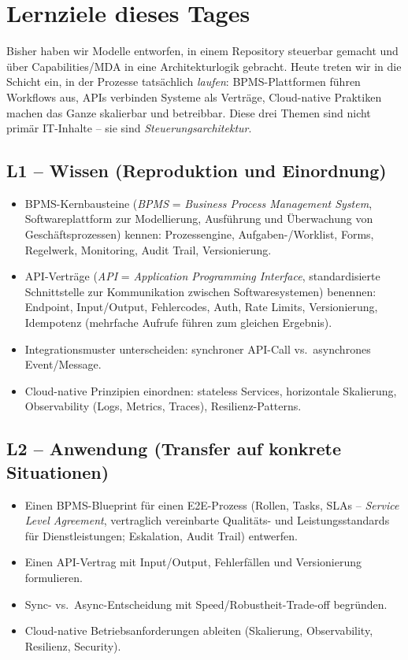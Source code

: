 \documentclass[11pt,a4paper,oneside]{article}
\begin{document}
\section*{Lernziele dieses Tages}
\thispagestyle{plain}

\noindent Bisher haben wir Modelle entworfen, in einem Repository steuerbar gemacht und über Capabilities/MDA in eine Architekturlogik gebracht. Heute treten wir in die Schicht ein, in der Prozesse tatsächlich \emph{laufen}: BPMS-Plattformen führen Workflows aus, APIs verbinden Systeme als Verträge, Cloud-native Praktiken machen das Ganze skalierbar und betreibbar. Diese drei Themen sind nicht primär IT-Inhalte -- sie sind \emph{Steuerungsarchitektur}.

\subsection*{L1 -- Wissen (Reproduktion und Einordnung)}
\begin{itemize}
  \item BPMS-Kernbausteine (\emph{BPMS} = \emph{Business Process Management System}, Softwareplattform zur Modellierung, Ausführung und Überwachung von Geschäftsprozessen) kennen: Prozessengine, Aufgaben-/Worklist, Forms, Regelwerk, Monitoring, Audit Trail, Versionierung.
  \item API-Verträge (\emph{API} = \emph{Application Programming Interface}, standardisierte Schnittstelle zur Kommunikation zwischen Softwaresystemen) benennen: Endpoint, Input/Output, Fehlercodes, Auth, Rate Limits, Versionierung, Idempotenz (mehrfache Aufrufe führen zum gleichen Ergebnis).
  \item Integrationsmuster unterscheiden: synchroner API-Call vs.\ asynchrones Event/Message.
  \item Cloud-native Prinzipien einordnen: stateless Services, horizontale Skalierung, Observability (Logs, Metrics, Traces), Resilienz-Patterns.
\end{itemize}

\subsection*{L2 -- Anwendung (Transfer auf konkrete Situationen)}
\begin{itemize}
  \item Einen BPMS-Blueprint für einen E2E-Prozess (Rollen, Tasks, SLAs -- \emph{Service Level Agreement}, vertraglich vereinbarte Qualitäts- und Leistungsstandards für Dienstleistungen; Eskalation, Audit Trail) entwerfen.
  \item Einen API-Vertrag mit Input/Output, Fehlerfällen und Versionierung formulieren.
  \item Sync- vs.\ Async-Entscheidung mit Speed/Robustheit-Trade-off begründen.
  \item Cloud-native Betriebsanforderungen ableiten (Skalierung, Observability, Resilienz, Security).
\end{itemize}
\end{document}
